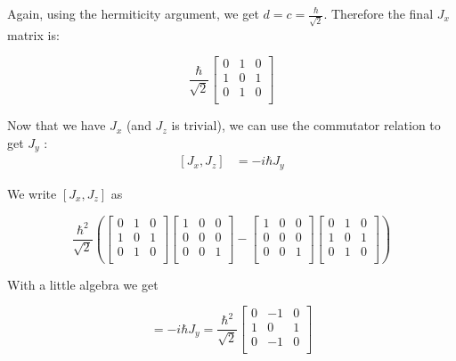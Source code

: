 \begin{alphaparts}
Again, using the hermiticity argument, we get $d = c = \frac{\hbar}{\sqrt{2}}$. Therefore the final $J_x$ matrix is:

\begin{equation}
    \frac{\hbar}{\sqrt{2}}
    \begin{bmatrix}
    0 & 1 & 0 \\
    1 & 0 & 1 \\
    0 & 1 & 0 \\
    \end{bmatrix}
\end{equation}

Now that we have $J_x$ (and $J_z$ is trivial), we can use the commutator relation to get $J_y$ :
\begin{equation}
\begin{split}
    [J_x,J_z] &= -i \hbar J_y  
\end{split}
\end{equation}

We write $[J_x,J_z]$ as

\begin{equation}
    \frac{\hbar^2}{\sqrt{2}}(
    \begin{bmatrix}
    0 & 1 & 0 \\
    1 & 0 & 1 \\
    0 & 1 & 0 \\
    \end{bmatrix}
    \begin{bmatrix}
    1 & 0 & 0 \\
    0 & 0 & 0 \\
    0 & 0 & 1 \\
    \end{bmatrix} 
    -
    \begin{bmatrix}
    1 & 0 & 0 \\
    0 & 0 & 0 \\
    0 & 0 & 1 \\
    \end{bmatrix}
    \begin{bmatrix}
    0 & 1 & 0 \\
    1 & 0 & 1 \\
    0 & 1 & 0 \\
    \end{bmatrix})
\end{equation}

With a little algebra we get 

\begin{equation}
    [J_x,J_z] = -i \hbar J_y  = \frac{\hbar^2}{\sqrt{2}}
        \begin{bmatrix}
    0 & -1 & 0 \\
    1 & 0 & 1 \\
    0 & -1 & 0 \\
    \end{bmatrix}
\end{equation}


\end{alphaparts}
